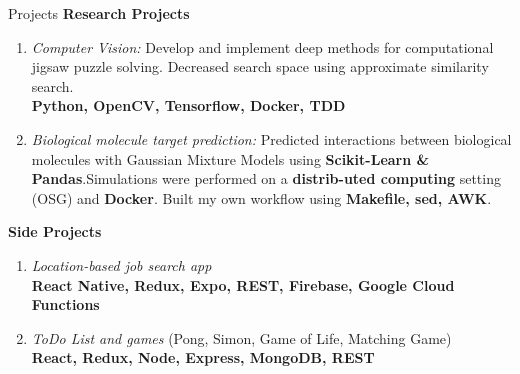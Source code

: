 \documentclass{resume} %
\newenvironment{cvEnum}
{ \begin{enumerate}[]
    \setlength{\itemsep}{0pt}
    \setlength{\parskip}{0pt}
    \setlength{\parsep}{0pt}     }
{ \end{enumerate}                  }
\begin{document}
\begin{rSection}{Projects}
{\bf Research Projects}
\begin{cvEnum}
\item {\large{\em Computer Vision:}}
 Develop and implement deep methods for computational jigsaw
       puzzle solving. Decreased search space using approximate
       similarity search.\\
       \textbf{Python, OpenCV, Tensorflow, Docker,
       TDD}
     \vspace{0.3cm}

   \item {\large {\em Biological molecule target prediction:}} Predicted
     interactions between biological molecules with Gaussian
     Mixture Models using \textbf{Scikit-Learn \& Pandas}.Simulations
     were performed on a \textbf{distrib-uted
       computing} setting (OSG) and \textbf{Docker}. Built my own workflow
     using \textbf{Makefile, sed, AWK}.

\begin{comment}
    \item {\em Deep similarity search:} Develop and implement methods
      to find similarity preserving embeddings of data using
      locality-sensitive hashing. (\textbf{TensorFlow \& Keras})

    \item {\em Deep Generative Models for Optimization Problems}: (Ongoing) Develop and implement methods to solve optimization problems. (\textbf{PyTorch, TensorFlow})

\end{comment}
\end{cvEnum}
{\bf Side Projects}
\begin{cvEnum}
\item {\large{\em Location-based job search app}}  \\\textbf{React Native,
    Redux, Expo, REST, Firebase, Google Cloud Functions}
  \vspace{0.3cm}
\item {\large {\em ToDo List and games} (Pong, Simon, Game of Life, Matching
    Game)} \\
  \textbf{React, Redux, Node, Express, MongoDB, REST}

      \end{cvEnum}


\end{rSection}
\end{document}
